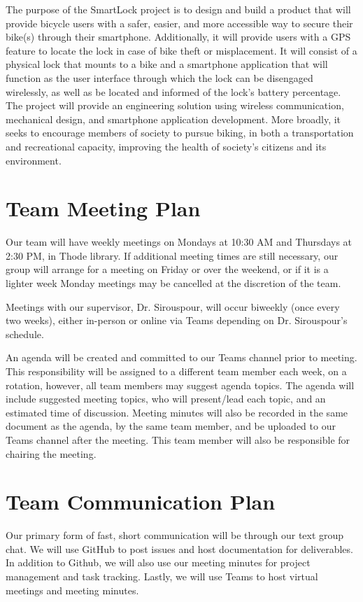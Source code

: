 \documentclass{article}
\begin{document}
The purpose of the SmartLock project is to design and build a product that will provide bicycle users with a safer, easier, and more accessible way to secure their bike(s) through their smartphone. Additionally, it will provide users with a GPS feature to locate the lock in case of bike theft or misplacement.  It will consist of a physical lock that mounts to a bike and a smartphone application that will function as the user interface through which the lock can be disengaged wirelessly, as well as be located and informed of the lock's battery percentage. The project will provide an engineering solution using wireless communication, mechanical design, and smartphone application development. More broadly, it seeks to encourage members of society to pursue biking, in both a transportation and recreational capacity, improving the health of society’s citizens and its environment.  

\section{Team Meeting Plan}

Our team will have weekly meetings on Mondays at 10:30 AM and Thursdays at 2:30 PM, in Thode library. If additional meeting times are still necessary, our group will arrange for a meeting on Friday or over the weekend, or if it is a lighter week Monday meetings may be cancelled at the discretion of the team.

Meetings with our supervisor, Dr. Sirouspour, will occur biweekly (once every two weeks), either in-person or online via Teams depending on Dr. Sirouspour's schedule.

An agenda will be created and committed to our Teams channel prior to meeting.  This responsibility will be assigned to a different team member each week, on a rotation, however, all team members may suggest agenda topics.  The agenda will include suggested meeting topics, who will present/lead each topic, and an estimated time of discussion. Meeting minutes will also be recorded in the same document as the agenda, by the same team member, and be uploaded to our Teams channel after the meeting.  This team member will also be responsible for chairing the meeting. 

\section{Team Communication Plan}

Our primary form of fast, short communication will be through our text group chat. We will use GitHub to post issues and host documentation for deliverables.  In addition to Github, we will also use our meeting minutes for project management and task tracking.  Lastly, we will use Teams to host virtual meetings and meeting minutes.
\end{document}
